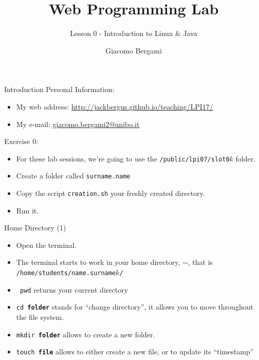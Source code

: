 \documentclass{beamer}
\title{Web Programming Lab}
\subtitle{Lesson 0 - Introduction to Linux \& Java}
\author{Giacomo Bergami}
\institute{University of Bologna}
\begin{document}
  \maketitle
  
    \begin{frame}{Introduction}
    Personal Information:
    \begin{itemize}
    	\item My web address: \url{http://jackbergus.github.io/teaching/LPI17/}
    	\item My e-mail: \href{mailto:giacomo.bergami2@unibo.it}{giacomo.bergami2@unibo.it}
    \end{itemize}
    
    Exercise 0:
  	\begin{itemize}
  		\item For these lab sessions, we're going to use the  \texttt{/public/lpi07/slot0$k$} folder.
  		\item Create a folder called \texttt{surname.name}
  		\item Copy the script \texttt{creation.sh} your freshly created directory.
  		\item Run it.
  	\end{itemize}
  \end{frame}
  
  \begin{frame}{Home Directory (1)}
    \begin{itemize}
    	\item Open the terminal. 
    	\item The terminal starts to work in your home directory, $\sim$, that is \texttt{/home/students/name.surname$k$/}
    	\item \texttt{\color{green} pwd} returns your current directory
    	\item \texttt{\color{green}cd \textbf{\color{red}folder}} stands for ``change directory'', it allows you to move throughout the file system.
    	\item \texttt{\color{green}mkdir \textbf{\color{red}folder}} allows to create a new folder.
    	\item \texttt{\color{green}touch \textbf{\color{red}file}} allows to either create a new file, or to update its ``timestamp''
    \end{itemize}
  \end{frame}
\end{document}
